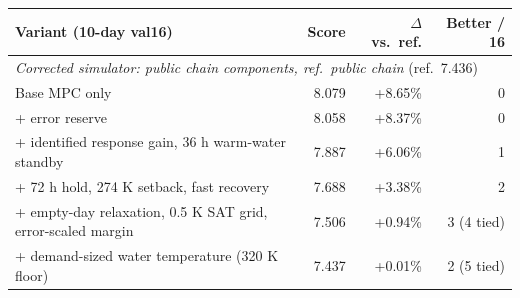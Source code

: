 \begin{tabular}{lrrr}
\toprule
Variant (10-day val16) & Score & $\Delta$ vs.\ ref. & Better / 16 \\
\midrule
\multicolumn{4}{l}{\emph{Corrected simulator: public chain components, ref.\ public chain} (ref.\ 7.436)} \\
Base MPC only~\citep{wu2026cpu} & 8.079 & +8.65\% & 0 \\
+ error reserve & 8.058 & +8.37\% & 0 \\
+ identified response gain, 36 h warm-water standby & 7.887 & +6.06\% & 1 \\
+ 72 h hold, 274 K setback, fast recovery & 7.688 & +3.38\% & 2 \\
+ empty-day relaxation, 0.5 K SAT grid, error-scaled margin & 7.506 & +0.94\% & 3 (4 tied) \\
+ demand-sized water temperature (320 K floor) & 7.437 & +0.01\% & 2 (5 tied) \\
\bottomrule
\end{tabular}
